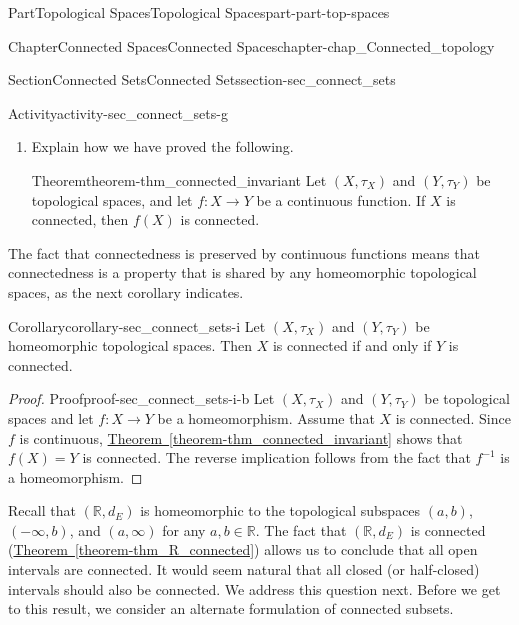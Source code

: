 \documentclass[oneside,10pt,]{book}
\newcommand{\blocktitlefont}{\relax}
\newcommand{\xreffont}{\relax}
\numberwithin{equation}{chapter}
\newcommand{\R}{\mathbb{R}}
\begin{document}
\begin{partptx}{Part}{Topological Spaces}{}{Topological Spaces}{}{}{part-part-top-spaces}
\begin{chapterptx}{Chapter}{Connected Spaces}{}{Connected Spaces}{}{}{chapter-chap_Connected_topology}
\begin{sectionptx}{Section}{Connected Sets}{}{Connected Sets}{}{}{section-sec_connect_sets}
\begin{activity}{Activity}{}{activity-sec_connect_sets-g}
\begin{enumerate}[font=\bfseries,label=(\alph*),ref=\alph*]
\begin{enumerate}[font=\bfseries,label=(\roman*),ref=\theenumi.\roman*]
\noindent\textbf{\blocktitlefont Hint}.\hypertarget{hint-sec_connect_sets-g-c-d-b}{}\quad{}Use the fact that \(g\) is a surjection.%
\item{}Now show that \(R \cap S = \emptyset\). (Hint: \(R \cap S = g^{-1}(U) \cap g^{-1}(V)\).)%
\end{enumerate}%
\item{}Explain how we have proved the following.%
\begin{theorem}{Theorem}{}{}{theorem-thm_connected_invariant}%
Let \((X, \tau_X)\) and \((Y, \tau_Y)\) be topological spaces, and let \(f : X \to Y\) be a continuous function. If \(X\) is connected, then \(f(X)\) is connected.%
\end{theorem}
\end{enumerate}%
\end{activity}%
The fact that connectedness is preserved by continuous functions means that connectedness is a property that is shared by any homeomorphic topological spaces, as the next corollary indicates.%
\begin{corollary}{Corollary}{}{}{corollary-sec_connect_sets-i}%
Let \((X, \tau_X)\) and \((Y, \tau_Y)\) be homeomorphic topological spaces. Then \(X\) is connected if and only if \(Y\) is connected.%
\end{corollary}
\begin{proof}{Proof}{}{proof-sec_connect_sets-i-b}
Let \((X, \tau_X)\) and \((Y, \tau_Y)\) be topological spaces and let \(f: X \to Y\) be a homeomorphism. Assume that \(X\) is connected. Since \(f\) is continuous, \hyperref[theorem-thm_connected_invariant]{Theorem~{\xreffont\ref{theorem-thm_connected_invariant}}} shows that \(f(X) = Y\) is connected. The reverse implication follows from the fact that \(f^{-1}\) is a homeomorphism.%
\end{proof}
Recall that \((\R,d_E)\) is homeomorphic to the topological subspaces \((a,b)\), \((-\infty,
b)\), and \((a,\infty)\) for any \(a, b \in \R\). The fact that \((\R, d_E)\) is connected (\hyperref[theorem-thm_R_connected]{Theorem~{\xreffont\ref{theorem-thm_R_connected}}}) allows us to conclude that all open intervals are connected. It would seem natural that all closed (or half-closed) intervals should also be connected. We address this question next. Before we get to this result, we consider an alternate formulation of connected subsets.%
\par

\end{sectionptx}
\end{chapterptx}
\end{partptx}
\end{document}
